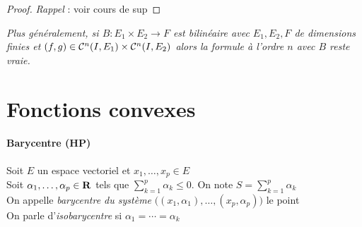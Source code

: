      \medskip
    
    
    \begin{proof} 
    \emph{Rappel} : voir cours de sup 
    \end{proof} \medskip
    
    \emph{Plus généralement, si $B : E_1\times E_2 \rightarrow F$ est bilinéaire avec $E_1,E_2,F$ de dimensions finies et $(f,g) \in {\mathcal{C}}^n(I,E_1)\times{\mathcal{C}}^n(I,E_2)$ alors la formule à l'ordre $n$ avec $B$ reste vraie.}
    
    
     \medskip
    
    
\section{Fonctions convexes}
    
    \vspace{-15pt}
    \traitd
    \paragraph{Barycentre (HP)}
        Soit $E$ un espace vectoriel et $x_1,\dots ,x_p \in E$ \\
        Soit $\alpha_1 ,\dots ,\alpha_p\in {\mathbf{R}}$ tels que $\sum_{k=1}^p \alpha_k \leqslant 0$. On note $S = \sum_{k=1}^p \alpha_k$\\
        On appelle \emph{barycentre du système} $\big( (x_1,\alpha_1) ,\dots ,(x_p,\alpha_p) \big)$ le point \\
        On parle d'\emph{isobarycentre} si $\alpha_1 = \cdots = \alpha_k$ 
	\trait 
	
